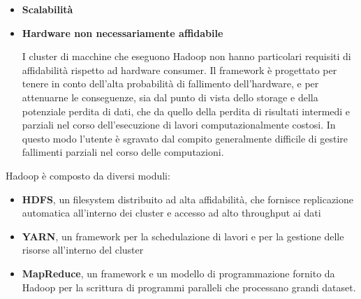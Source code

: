 \documentclass[italian,a4paper, twoside, 12pt]{report}
\begin{document}
\begin{itemize}
  \begin{figure}
  \def\svgwidth{\linewidth}
  
  \label{fig:hadoop-topology}
  \caption{Topologia di rete tipica di un cluster Hadoop.}
  \end{figure}

  Quando configurato per essere \emph{rack aware}, Hadoop considera il
  cluster come un insieme di \emph{rack} che contengono i nodi del
  cluster. Tutti i nodi di un rack sono connessi a uno switch di rete (o
  dispositivo equivalente), e tutti gli switch sono a loro volta
  connessi a uno switch centrale. Questa struttura è mostrata in
  fig.~\ref{fig:hadoop-topology}.

  A partire da questa struttura si può fare un'assunzione importante: la
  comunicazione tra nodi in uno stesso rack è meno onerosa in termini di
  banda rispetto alla comunicazione tra nodi in rack diversi, perché la
  comunicazione può essere commutata tramite un solo switch.

  Quando possibile, Hadoop utilizza questo principio per minimizzare
  l'uso di banda tra nodi del cluster. Come si vedrà, i vari componenti
  di Hadoop fanno uso della configurazione di rete per raggiungere
  diversi risultati.
\item
  \textbf{Scalabilità}

  \textbar{}\textbar{}\textbar{}
\item
  \textbf{Hardware non necessariamente affidabile}

  I cluster di macchine che eseguono Hadoop non hanno particolari
  requisiti di affidabilità rispetto ad hardware consumer. Il framework
  è progettato per tenere in conto dell'alta probabilità di fallimento
  dell'hardware, e per attenuarne le conseguenze, sia dal punto di vista
  dello storage e della potenziale perdita di dati, che da quello della
  perdita di risultati intermedi e parziali nel corso dell'esecuzione di
  lavori computazionalmente costosi. In questo modo l'utente è sgravato
  dal compito generalmente difficile di gestire fallimenti parziali nel
  corso delle computazioni.
\end{itemize}

Hadoop è composto da diversi moduli:

\begin{itemize}
\item
  \textbf{HDFS}, un filesystem distribuito ad alta affidabilità, che
  fornisce replicazione automatica all'interno dei cluster e accesso ad
  alto throughput ai dati
\item
  \textbf{YARN}, un framework per la schedulazione di lavori e per la
  gestione delle risorse all'interno del cluster
\item
  \textbf{MapReduce}, un framework e un modello di programmazione
  fornito da Hadoop per la scrittura di programmi paralleli che
  processano grandi dataset.
\end{itemize}
\end{document}
